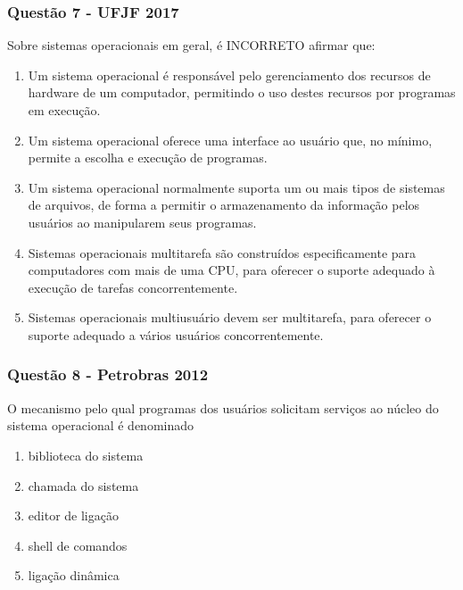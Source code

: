 \documentclass[aspectratio=169,
				xcolor=table]{beamer}
\begin{document}
	\begin{frame}
		\frametitle{Questão 7 - UFJF 2017}
		Sobre sistemas operacionais em geral, é INCORRETO afirmar que:
		\begin{enumerate}[a]
			\small
			\item Um sistema operacional é responsável pelo gerenciamento dos recursos de hardware de um computador, permitindo o uso destes recursos por programas em execução.  

			\item Um sistema operacional oferece uma interface ao usuário que, no mínimo, permite a escolha e execução de programas. 

			\item Um sistema operacional normalmente suporta um ou mais tipos de sistemas de arquivos, de forma a permitir o armazenamento da informação pelos usuários ao manipularem seus programas.  

			\item Sistemas operacionais multitarefa são construídos especificamente para computadores com mais de uma CPU, para oferecer o suporte adequado à execução de tarefas concorrentemente. 

			\item Sistemas operacionais multiusuário devem ser multitarefa, para oferecer o suporte adequado a vários usuários concorrentemente.

		\end{enumerate}

	\end{frame}
	
	\begin{frame}
		\frametitle{Questão 8 - Petrobras 2012}
		O mecanismo pelo qual programas dos usuários solicitam serviços ao núcleo do sistema operacional é denominado
		\begin{enumerate}[a]
			\item biblioteca do sistema

			\item chamada do sistema

			\item editor de ligação 

			\item shell de comandos

			\item ligação dinâmica

		\end{enumerate}

	\end{frame}
\end{document}
